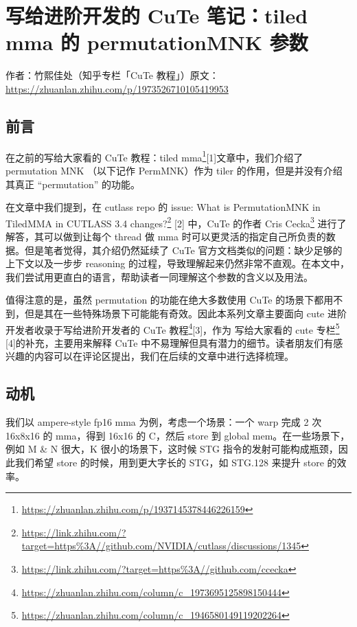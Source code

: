 \chapter{写给进阶开发的 CuTe 笔记：tiled mma 的 permutationMNK 参数}

\begin{center}\small 作者：竹熙佳处（知乎专栏「CuTe 教程」）\quad 原文：\url{https://zhuanlan.zhihu.com/p/1973526710105419953}\end{center}

\section{前言}

在之前的写给大家看的 CuTe 教程：tiled mma\footnote{\url{https://zhuanlan.zhihu.com/p/1937145378446226159}}[1]文章中，我们介绍了 permutation MNK （以下记作 PermMNK）作为 tiler 的作用，但是并没有介绍其真正 “permutation” 的功能。

在文章中我们提到，在 cutlass repo 的 issue: What is PermutationMNK in TiledMMA in CUTLASS 3.4 changes?\footnote{\url{https://link.zhihu.com/?target=https\%3A//github.com/NVIDIA/cutlass/discussions/1345}} [2] 中，CuTe 的作者 Cris Cecka\footnote{\url{https://link.zhihu.com/?target=https\%3A//github.com/ccecka}} 进行了解答，其可以做到让每个 thread 做 mma 时可以更灵活的指定自己所负责的数据。但是笔者觉得，其介绍仍然延续了 CuTe 官方文档类似的问题：缺少足够的上下文以及一步步 reasoning 的过程，导致理解起来仍然非常不直观。在本文中，我们尝试用更直白的语言，帮助读者一同理解这个参数的含义以及用法。

值得注意的是，虽然 permutation 的功能在绝大多数使用 CuTe 的场景下都用不到，但是其在一些特殊场景下可能能有奇效。因此本系列文章主要面向 cute 进阶开发者收录于写给进阶开发者的 CuTe 教程\footnote{\url{https://zhuanlan.zhihu.com/column/c_1973695125898150444}}[3]，作为 写给大家看的 cute 专栏\footnote{\url{https://zhuanlan.zhihu.com/column/c_1946580149119202264}} [4]的补充，主要用来解释 CuTe 中不易理解但具有潜力的细节。读者朋友们有感兴趣的内容可以在评论区提出，我们在后续的文章中进行选择梳理。

\section{动机}

我们以 ampere-style fp16 mma 为例，考虑一个场景：一个 warp 完成 2 次 16x8x16 的 mma，得到 16x16 的 C，然后 store 到 global mem。在一些场景下，例如 M \& N 很大，K 很小的场景下，这时候 STG 指令的发射可能构成瓶颈，因此我们希望 store 的时候，用到更大字长的 STG，如 STG.128 来提升 store 的效率。


